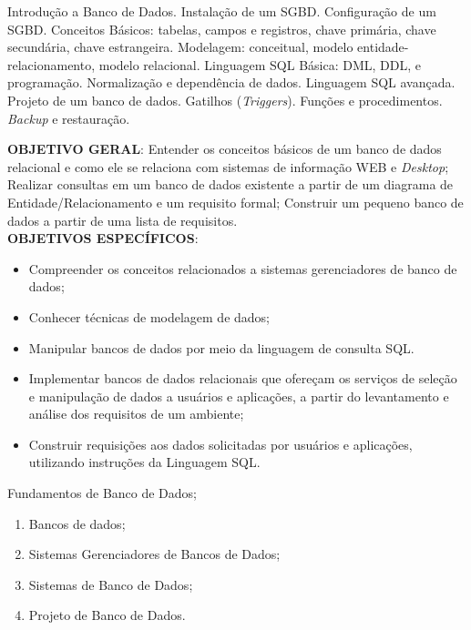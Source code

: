 \begin{pud}

	
	
	\ementa
	Introdução a Banco de Dados. Instalação de um SGBD. Configuração de um SGBD. Conceitos Básicos: tabelas, campos e registros, chave primária, chave secundária, chave estrangeira. Modelagem: conceitual, modelo entidade-relacionamento, modelo relacional. Linguagem SQL Básica: DML, DDL, e programação. Normalização e dependência de dados. Linguagem SQL avançada. Projeto de um banco de dados. Gatilhos (\textit{Triggers}). Funções e procedimentos. \textit{Backup} e restauração.
	
	\objetivos
	\textbf{OBJETIVO GERAL}:
	Entender os conceitos básicos de um banco de dados relacional e como ele se relaciona com sistemas de informação WEB e \textit{Desktop}; Realizar consultas em um banco de dados existente a partir de um diagrama de Entidade/Relacionamento e um requisito formal; Construir um pequeno banco de dados a partir de uma lista de requisitos.	
	\newline\\	
	\textbf{OBJETIVOS ESPECÍFICOS}:
	\begin{itemize}
		\item Compreender os conceitos relacionados a sistemas gerenciadores de banco de dados;
		\item Conhecer técnicas de modelagem de dados;
		\item  Manipular bancos de dados por meio da linguagem de consulta SQL.
		\item  Implementar bancos de dados relacionais que ofereçam os serviços de seleção e manipulação de dados a usuários e aplicações, a partir do levantamento e análise dos requisitos de um ambiente;
		\item Construir requisições aos dados solicitadas por usuários e aplicações, utilizando instruções da Linguagem SQL.
	\end{itemize}
	
	
	\programa
	\begin{description}[itemsep=0em]
		\item[UNIDADE I:] Fundamentos de  Banco de Dados; 
	         \begin{enumerate}[itemsep=0em, topsep=0em]
                \item Bancos de dados;
                \item Sistemas Gerenciadores de Bancos de Dados;
                \item Sistemas de Banco de Dados;
                \item Projeto de Banco de Dados.
            \end{enumerate}
            

\end{description}
\end{pud}
